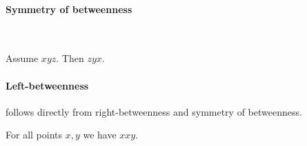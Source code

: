 \documentclass{article}
\newcommand{\Betw}[3]{#1 #2 #3}
\begin{document}
  \paragraph{Symmetry of betweenness}\

  \begin{forthel}
    \begin{lemma} %
      Assume $\Betw{x}{y}{z}$. Then $\Betw{z}{y}{x}$.
    \end{lemma}
  \end{forthel}

  \paragraph{Left-betweenness} follows directly
  from right-betweenness and symmetry of betweenness.
  \begin{forthel}
    \begin{lemma} %
      For all points $x, y$ we have  $\Betw{x}{x}{y}$.
    \end{lemma}
  \end{forthel}
\end{document}
